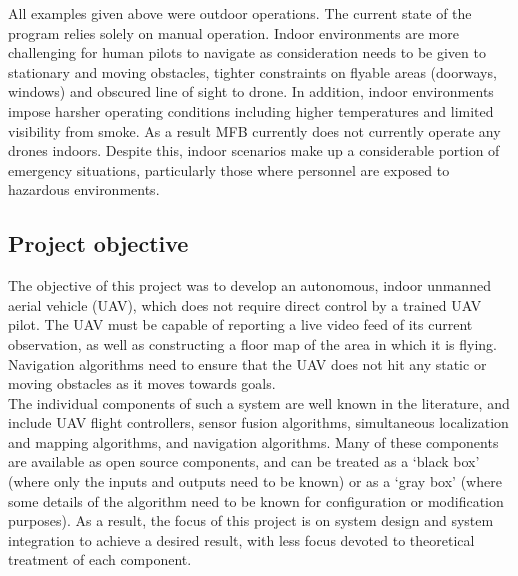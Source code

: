 \documentclass[capstone_report.tex]{subfiles}
\begin{document}
All examples given above were outdoor operations. The current state of the program relies solely on manual operation. Indoor environments are more challenging for human pilots to navigate as consideration needs to be given to stationary and moving obstacles, tighter constraints on flyable areas (doorways, windows) and obscured line of sight to drone. In addition, indoor environments impose harsher operating conditions including higher temperatures and limited visibility from smoke. As a result MFB currently does not currently operate any drones indoors. Despite this, indoor scenarios make up a considerable portion of emergency situations, particularly those where personnel are exposed to hazardous environments.\\

\subsection{Project objective}
The objective of this project was to develop an autonomous, indoor unmanned aerial vehicle (UAV),  which does not require direct control by a trained UAV pilot. The UAV must be capable of reporting a live video feed of its current observation, as well as constructing a floor map of the area in which it is flying. Navigation algorithms need to ensure that the UAV does not hit any static or moving obstacles as it moves towards goals.\\

The individual components of such a system are well known in the literature, and include UAV flight controllers, sensor fusion algorithms, simultaneous localization and mapping algorithms, and navigation algorithms. Many of these components are available as open source components, and can be treated as a `black box' (where only the inputs and outputs need to be known) or as a `gray box' (where some details of the algorithm need to be known for configuration or modification purposes). As a result, the focus of this project is on system design and system integration to achieve a desired result, with less focus devoted to theoretical treatment of each component.\\
\end{document}
